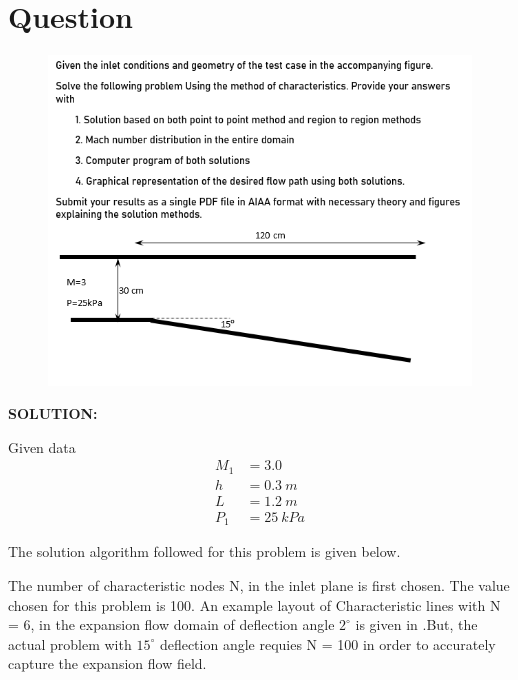 \section{Question}

\begin{figure}[!h]
    \center
    \includegraphics[scale=0.5]{results/question.png}
\end{figure}

\textbf{SOLUTION:}\\

\par Given data
\begin{align*}
    M_1 &= 3.0 \\
    h &= 0.3 \ m \\
    L &= 1.2 \ m \\
    P_1 &= 25 \ kPa
\end{align*}

\par The solution algorithm followed for this problem is given below.\\

\par The number of characteristic nodes N, in the inlet plane is first chosen. The
value chosen for this problem is 100. An example layout of Characteristic lines
with N = 6, in the expansion flow domain of deflection angle $2^{\circ}$ is given in
.But, the actual problem with $15^{\circ}$ deflection angle
requies N = 100 in order to accurately capture the expansion flow field. \\

